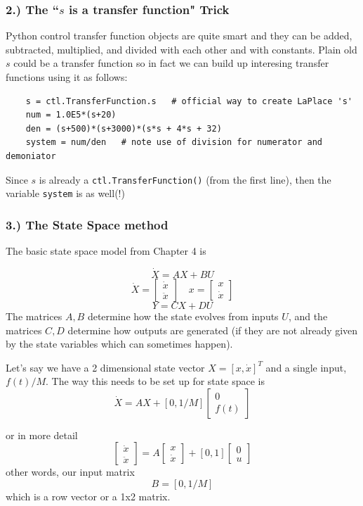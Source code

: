 \subsubsection{2.) The ``$s$ is a transfer function" Trick}
Python control transfer function objects are quite smart and they can be added,
subtracted, multiplied, and divided with each other and with constants.
Plain old $s$ could be a transfer function so in fact we can build up interesing
transfer functions using it as follows:
\begin{verbatim}
    s = ctl.TransferFunction.s   # official way to create LaPlace 's'
    num = 1.0E5*(s+20)
    den = (s+500)*(s+3000)*(s*s + 4*s + 32)
    system = num/den   # note use of division for numerator and demoniator
\end{verbatim}
Since $s$ is already a {\tt ctl.TransferFunction()}  (from the first line), then
the variable {\tt system} is as well(!)

\subsubsection{3.) The State Space method}
The basic state space model from Chapter 4 is


\[
\dot{X} = AX+BU
\]
\[
\dot{X} = \begin{bmatrix}\dot{x} \\ \ddot{x} \end{bmatrix} \quad
x = \begin{bmatrix} x \\ \dot{x}  \end{bmatrix}
\]
\[
Y = CX+DU
\]
The matrices $A,B$ determine how the state evolves from inputs $U$, and
the matrices $C,D$ determine how outputs are generated (if they are not
already given by the state variables which can sometimes happen).

Let's say we have a 2 dimensional state vector $X=[x,\dot{x}]^T$ and
a single input, $f(t)/M$. The way this needs to be set up for state
space is
\[
\dot{X} = AX + [0,1/M]\begin{bmatrix} 0 \\f(t) \end{bmatrix}
\]

or in more detail
\[
\begin{bmatrix}\dot{x}\\ \ddot{x}\end{bmatrix} = A\begin{bmatrix}x\\ \dot{x}\end{bmatrix} + [0,1]\begin{bmatrix} 0\\u \end{bmatrix}
\]
other words, our input matrix
\[
B = [0,1/M]
\]
which is a row vector or a 1x2 matrix.

